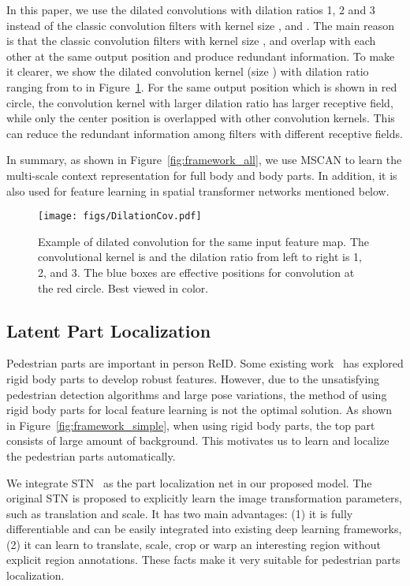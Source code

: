 \documentclass[10pt,twocolumn,letterpaper]{article}
\begin{document}
In this paper, we use the dilated convolutions with dilation ratios 1, 2 and 3 instead of the classic convolution filters with kernel
size ,  and .
The main reason is that the classic convolution filters with kernel size ,  and  overlap with each other at the same output position and produce redundant information.
To make it clearer, we show the dilated convolution kernel (size ) with dilation ratio ranging from  to  in Figure~\ref{fig:DilationCov}.
For the same output position which is shown in red circle, the convolution kernel with larger dilation ratio has larger receptive field, while only the center position is overlapped with other convolution kernels.
This can reduce the redundant information among filters with different receptive fields.

In summary, as shown in Figure~\ref{fig:framework_all}, we use MSCAN to learn the multi-scale context representation for full body and body parts.
In addition, it is also used for feature learning in spatial transformer networks mentioned below.


\begin{figure}[!tbp]
  \centering
\texttt{[image: figs/DilationCov.pdf]}
  \caption{Example of dilated convolution for the same input feature map.
  The convolutional kernel is  and the dilation ratio from left to right is 1, 2, and 3.
  The blue boxes are effective positions for convolution at the red circle.
  Best viewed in color.
  }
  \label{fig:DilationCov}
  \vspace{-1em}
\end{figure}

\subsection{Latent Part Localization}
\label{LatentPartLoc}
Pedestrian parts are important in person ReID.
Some existing work~\cite{GrayECCV08,LiaoshengcaiCVPR15,YiICPR14DML,Chengde2016person} has explored rigid body parts to develop robust features.
However, due to the unsatisfying pedestrian detection algorithms and large pose variations, the method of using rigid body parts for local
feature learning is not the optimal solution.
As shown in Figure~\ref{fig:framework_simple}, when using rigid body parts, the top part consists of large amount of background.
This motivates us to learn and localize the pedestrian parts automatically.

We integrate STN~\cite{JaderbergNIPS15spatial} as the part localization net in our proposed model.
The original STN is proposed to explicitly learn the image transformation parameters, such as translation and scale.
It has two main advantages: (1) it is fully differentiable and can be easily integrated into existing deep learning frameworks,
(2) it can learn to translate, scale, crop or warp an interesting region without explicit region annotations.
These facts make it very suitable for pedestrian parts localization.
\end{document}
